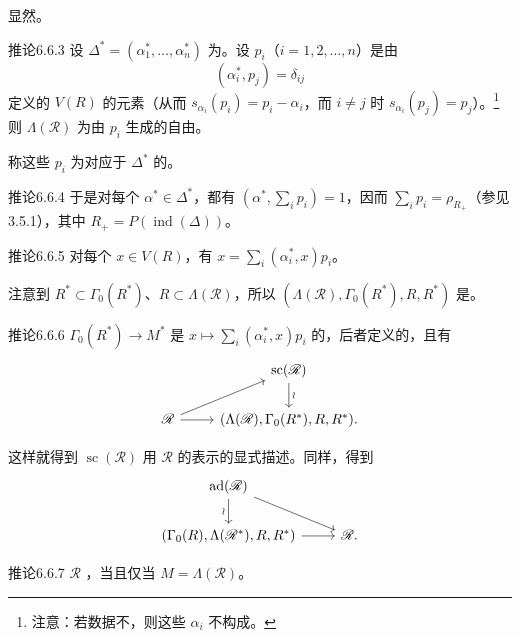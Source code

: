 显然。
\begin{SGAresult}{推论}{6.6.3}
设 $\Delta^*=(\alpha_1^*,\ldots,\alpha_n^*)$ 为。设 $p_i$（$i=1,2,\ldots,n$）是由
\[(\alpha_i^*,p_j)=\delta_{ij}\]
定义的 $V(R)$ 的元素（从而 $s_{\alpha_i}(p_i)=p_i-\alpha_i$，而 $i\ne j$ 时 $s_{\alpha_i}(p_j)=p_j$）。\begingroup\renewcommand{\thefootnote}{*}\footnote[0]{注意：若数据不，则这些 $\alpha_i$ 不构成。}\endgroup 则 $\Lambda(\mathscr R)$ 为由 $p_i$ 生成的自由。
\end{SGAresult}
称这些 $p_i$ 为对应于 $\Delta^*$ 的。
\begin{SGAresult}{推论}{6.6.4}
于是对每个 $\alpha^*\in\Delta^*$，都有 $(\alpha^*,\sum_i p_i)=1$，因而 $\sum_i p_i=\rho_{R_+}$（参见 3.5.1），其中 $R_+=P(\operatorname{ind}(\Delta))$。
\end{SGAresult}
\begin{SGAresult}{推论}{6.6.5}
对每个 $x\in V(R)$，有 $x=\sum_i(\alpha_i^*,x)p_i$。
\end{SGAresult}
注意到 $R^*\subset\Gamma_0(R^*)$、$R\subset\Lambda(\mathscr R)$，所以 $(\Lambda(\mathscr R),\Gamma_0(R^*),R,R^*)$ 是。
\begin{SGAresult}{推论}{6.6.6}
 $\Gamma_0(R^*)\to M^*$ 是 $x\mapsto\sum_i(\alpha_i^*,x)p_i$ 的，后者定义的，且有
\[\begin{tikzcd}
&\operatorname{sc}(\mathscr R)\arrow[d,"\wr"]\\
\mathscr R\arrow[ur]\arrow[r]&(\Lambda(\mathscr R),\Gamma_0(R^*),R,R^*).
\end{tikzcd}\]
\end{SGAresult}
这样就得到 $\operatorname{sc}(\mathscr R)$ 用 $\mathscr R$ 的表示的显式描述。同样，得到
\[\begin{tikzcd}
\operatorname{ad}(\mathscr R)\arrow[d,"\wr"']\arrow[dr]&\\
(\Gamma_0(R),\Lambda(\mathscr R^*),R,R^*)\arrow[r]&\mathscr R.
\end{tikzcd}\]
\begin{SGAresult}{推论}{6.6.7}
$\mathscr R$ ，当且仅当 $M=\Lambda(\mathscr R)$。
\end{SGAresult}
